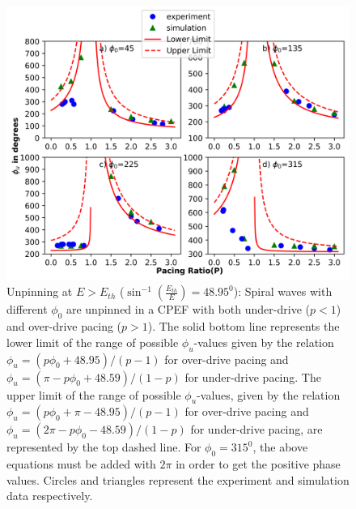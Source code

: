 \iffalse
\begin{figure}[htb!]
    \centering
    \includegraphics{E>Eth.png}
    \caption{Unpinning at $E>E_{th}$ 
    (${\sin^{-1}}{(\frac{E_{th}}{E})}=48.95^0$): Spiral waves with different
	${\phi}_0$ are unpinned in a CPEF with both under-drive ($p<1$) and
	over-drive pacing ($p>1$). The solid bottom line represents the lower
	limit of the range of possible ${\phi}_u$-values given by the relation
	${\phi}_u=(p{\phi}_0+48.95)/(p-1)$ for over-drive pacing and
	${\phi}_u=(\pi-p{\phi}_0+48.59)/(1-p)$ for under-drive pacing. The
	upper limit of the range of possible ${\phi}_u$-values, given by the
	relation ${\phi}_u=(p{\phi}_0+\pi-48.95)/(p-1)$ for over-drive pacing
	and ${\phi}_u=(2\pi-p{\phi}_0-48.59)/(1-p)$ for under-drive pacing, are
	represented by the top dashed line. For ${\phi}_0 = 315^0$, the above
	equations must be added with $2\pi$ in order to get the positive phase
	values.
    Circles and triangles represent the experiment and simulation data
	respectively.  }
    \label{fig:unpinning_E>Eth}
\end{figure}
%

